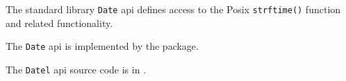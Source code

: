 
The standard library {\tt Date} 
api defines access to the Posix {\tt strftime()} function and related functionality.

The {\tt Date} api is implemented by the  package.

The {\tt Datel} api source code is in .





